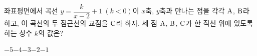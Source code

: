 \hspace*{2mm}\begin{minipage}[t]{\dimexpr\linewidth-2mm\relax}\vspace{0pt}
좌표평면에서 곡선 $y=\dfrac{k}{x-2}+1\ (k<0)$이 $x$축, $y$축과 만나는 점을 각각 $\mathrm{A}$, $\mathrm{B}$라 하고, 이 곡선의 두 점근선의 교점을 $\mathrm{C}$라 하자. 세 점 $\mathrm{A}$, $\mathrm{B}$, $\mathrm{C}$가 한 직선 위에 있도록 하는 상수 $k$의 값은?
\begin{choices32}{$-5$}{$-4$}{$-3$}{$-2$}{$-1$}\end{choices32}\end{minipage}
